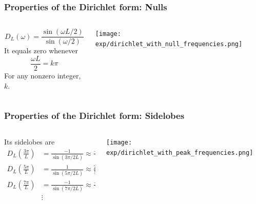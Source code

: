 \documentclass{beamer}
\begin{document}
\begin{frame}
  \frametitle{Properties of the Dirichlet form: Nulls}

  \begin{columns}
    \begin{column}{0.5\textwidth}

      \begin{displaymath}      
        D_L(\omega) = \frac{\sin(\omega L/2)}{\sin(\omega/2)}
      \end{displaymath}
      It equals zero whenever 
      \begin{displaymath}
        \frac{\omega L}{2} = k\pi
      \end{displaymath}
      For any nonzero integer, $k$.
    \end{column}
    \begin{column}{0.5\textwidth}
      \centerline{\texttt{[image: exp/dirichlet\_with\_null\_frequencies.png]}}
    \end{column}
  \end{columns}
\end{frame}

\begin{frame}
  \frametitle{Properties of the Dirichlet form: Sidelobes}

  \begin{columns}
    \begin{column}{0.5\textwidth}

      Its sidelobes are
      \begin{align*}      
        D_L\left(\frac{3\pi}{L}\right) &= \frac{-1}{\sin(3\pi/2L)}\approx \frac{-2L}{3\pi}\\
        D_L\left(\frac{5\pi}{L}\right) &= \frac{1}{\sin(5\pi/2L)}\approx \frac{2L}{5\pi}\\
        D_L\left(\frac{7\pi}{L}\right) &= \frac{-1}{\sin(7\pi/2L)}\approx \frac{-2L}{7\pi}\\
        & \vdots
      \end{align*}
    \end{column}
    \begin{column}{0.5\textwidth}
      \centerline{\texttt{[image: exp/dirichlet\_with\_peak\_frequencies.png]}}
    \end{column}
  \end{columns}
\end{frame}
\end{document}

